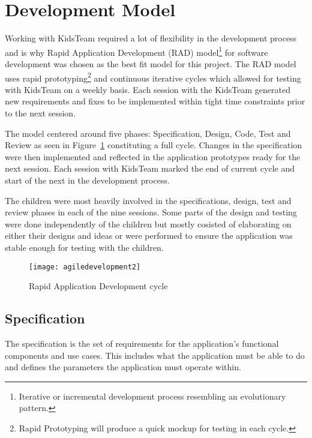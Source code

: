 \section{Development Model}
Working with KidsTeam required a lot of flexibility in the development process and is why Rapid Application Development (RAD) model\footnote{Iterative or incremental development process resembling an evolutionary pattern.} for software development was chosen as the best fit model for this project. The RAD model uses rapid prototyping\footnote{Rapid Prototyping will produce a quick mockup for testing in each cycle.} and continuous iterative cycles which allowed for testing with KidsTeam on a weekly basis. Each session with the KidsTeam generated new requirements and fixes to be implemented within tight time constraints prior to the next session.

The model centered around five phases: Specification, Design, Code, Test and Review as seen in Figure~\ref{fig:agiledesignprocess} constituting a full cycle. Changes in the specification were then implemented and reflected in the application prototypes ready for the next session. Each session with KidsTeam marked the end of current cycle and start of the next in the development process. \cite{0136061699}\cite{Ruparelia:2010:SDL:1764810.1764814}

The children were most heavily involved in the specifications, design, test and review phases in each of the nine sessions. Some parts of the design and testing were done independently of the children but mostly cosisted of elaborating on either their designs and ideas or were performed to ensure the application was stable enough for testing with the children.  

\begin{figure}
\centering
\texttt{[image: agiledevelopment2]}
\caption{Rapid Application Development cycle \cite{Ruparelia:2010:SDL:1764810.1764814} }
\label{fig:agiledesignprocess}
\end{figure}


\subsection{Specification}\label{sec:specificationphase}
The specification is the set of requirements for the application's functional components and use cases. This includes what the application must be able to do and defines the parameters the application must operate within. 

